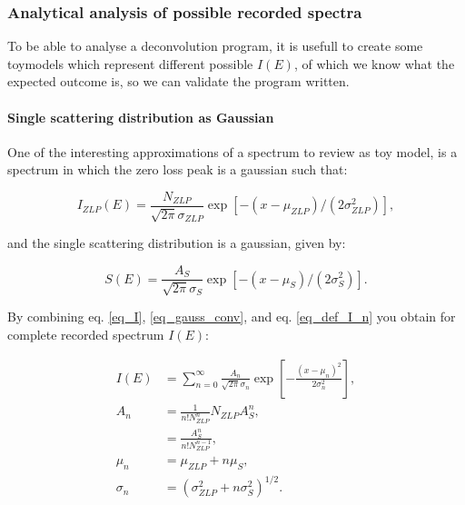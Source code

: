 \subsubsection{Analytical analysis of possible recorded spectra}
To be able to analyse a deconvolution program, it is usefull to create some toymodels which represent different possible $I(E)$, of which we know what the expected outcome is, so we can validate the program written.


\paragraph{Single scattering distribution as Gaussian}
One of the interesting approximations of a spectrum to review as toy model, is a spectrum in which the zero loss peak is a gaussian such that:

\begin{equation}\label{eq_ZLP_gauss}
I_{ZLP}(E) = \frac{N_{ZLP}}{\sqrt{2\pi}\sigma_{ZLP}} \exp{[-(x-\mu_{ZLP})/(2\sigma_{ZLP}^2)]},
\end{equation}

and the single scattering distribution is a gaussian, given by:

\begin{equation}\label{eq_S_gauss_conv}
S(E) = \frac{A_{S}}{\sqrt{2\pi}\sigma_{S}}  \exp{[-(x-\mu_{S})/(2\sigma_{S}^2)]}.
\end{equation}


By combining eq. \eqref{eq_I}, \eqref{eq_gauss_conv}, and eq. \eqref{eq_def_I_n} you obtain for complete recorded spectrum $I(E)$:

\begin{equation}\label{eq_I_gauss_conv}
\begin{aligned}
I(E) &= \sum_{n=0}^{\infty}  \frac{A_{n}}{\sqrt{2\pi}\sigma_n} \exp{\left[-\frac{(x-\mu_{n})^2}{2\sigma_{n}^2}\right]},\\
A_{n} &= \frac{1}{n! N_{ZLP}^n}N_{ZLP} A_S^n, \\
&= \frac{A_S^n}{n!N_{ZLP}^{n-1}}, \\
\mu_{n} &= \mu_{ZLP} + n \mu_S,\\
\sigma_{n} &= (\sigma_{ZLP}^2 + n \sigma_S^2)^{1/2}.
\end{aligned}
\end{equation}





